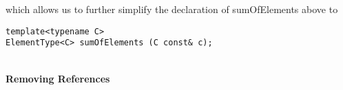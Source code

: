 which allows us to further simplify the declaration of sumOfElements above to

\begin{lstlisting}[style=styleCXX]
template<typename C>
ElementType<C> sumOfElements (C const& c);
\end{lstlisting}




\hspace*{\fill} \\ %
\noindent
\textbf{Removing References}


